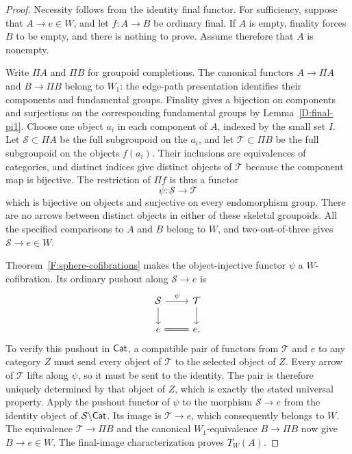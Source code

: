 \begin{proof}
Necessity follows from the identity final functor. For
sufficiency, suppose that $A\to e\in W$, and let
$f:A\to B$ be ordinary final. If $A$ is empty, finality
forces $B$ to be empty, and there is nothing to prove.
Assume therefore that $A$ is nonempty.

Write $\Pi A$ and $\Pi B$ for groupoid completions.
The canonical functors $A\to\Pi A$ and $B\to\Pi B$
belong to $W_1$: the edge-path presentation identifies
their components and fundamental groups. Finality gives
a bijection on components and surjections on the
corresponding fundamental groups by
Lemma~\ref{D:final-pi1}. Choose one object $a_i$ in each
component of $A$, indexed by the small set $I$.
Let $\mathcal S\subset\Pi A$ be the full subgroupoid on
the $a_i$, and let $\mathcal T\subset\Pi B$ be the full
subgroupoid on the objects $f(a_i)$. Their inclusions are
equivalences of categories, and distinct indices give
distinct objects of $\mathcal T$ because the component
map is bijective. The restriction of $\Pi f$ is thus a
functor
\[
 \psi:\mathcal S\longrightarrow\mathcal T
\]
which is bijective on objects and surjective on every
endomorphism group. There are no arrows between distinct
objects in either of these skeletal groupoids. All the
specified comparisons to $A$ and $B$ belong to $W$, and
two-out-of-three gives $\mathcal S\to e\in W$.

Theorem~\ref{F:sphere-cofibrations} makes the
object-injective functor $\psi$ a $W$-cofibration.
Its ordinary pushout along $\mathcal S\to e$ is
\[
 \begin{tikzcd}
 \mathcal S\arrow[r,"\psi"]\arrow[d]&
 \mathcal T\arrow[d]\\
 e\arrow[r,equal]&e.
 \end{tikzcd}
\]
To verify this pushout in $\mathsf{Cat}$, a compatible pair of
functors from $\mathcal T$ and $e$ to any category $Z$
must send every object of $\mathcal T$ to the selected
object of $Z$. Every arrow of $\mathcal T$ lifts along
$\psi$, so it must be sent to the identity. The pair is
therefore uniquely determined by that object of $Z$,
which is exactly the stated universal property.
Apply the pushout functor of $\psi$ to the morphism
$\mathcal S\to e$ from the identity object of
$\mathcal S\backslash\mathsf{Cat}$. Its image is
$\mathcal T\to e$, which consequently belongs to $W$.
The equivalence $\mathcal T\to\Pi B$ and the canonical
$W_1$-equivalence $B\to\Pi B$ now give $B\to e\in W$.
The final-image characterization proves $T_W(A)$.
\end{proof}

